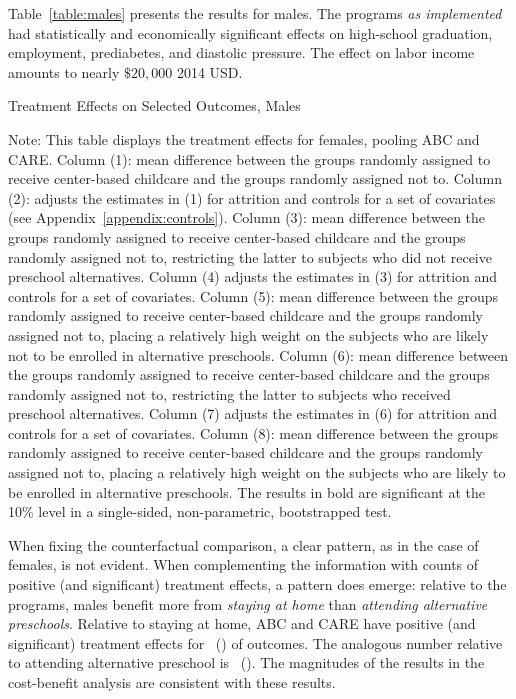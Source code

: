 \noindent Table~\ref{table:males} presents the results for males. The programs \textit{as implemented} had statistically and economically significant effects on high-school graduation, employment, prediabetes, and diastolic pressure. The effect on labor income amounts to nearly $\$20,000$ 2014 USD.\\


\begin{table}[H] 
\begin{threeparttable}
\caption{Treatment Effects on Selected Outcomes, Males}
\label{table:males}
\centering
\scalebox{.97}{ 
}
\begin{tablenotes}
\footnotesize
\item Note: This table displays the treatment effects for females, pooling ABC and CARE. Column (1): mean difference between the groups randomly assigned to receive center-based childcare and the groups randomly assigned not to. Column (2): adjusts the estimates in (1) for attrition and controls for a set of covariates (see Appendix~\ref{appendix:controls}). Column (3): mean difference between the groups randomly assigned to receive center-based childcare and the groups randomly assigned not to, restricting the latter to subjects who did not receive preschool alternatives. Column (4) adjusts the estimates in (3) for attrition and controls for a set of covariates. Column (5): mean difference between the groups randomly assigned to receive center-based childcare and the groups randomly assigned not to, placing a relatively high weight on the subjects who are likely not to be enrolled in alternative preschools. Column (6): mean difference between the groups randomly assigned to receive center-based childcare and the groups randomly assigned not to, restricting the latter to subjects who received preschool alternatives. Column (7) adjusts the estimates in (6) for attrition and controls for a set of covariates. Column (8): mean difference between the groups randomly assigned to receive center-based childcare and the groups randomly assigned not to, placing a relatively high weight on the subjects who are likely to be enrolled in alternative preschools. The results in bold are significant at the 10\% level in a single-sided, non-parametric, bootstrapped test.
\end{tablenotes}
\end{threeparttable}
\end{table}

\noindent When fixing the counterfactual comparison, a clear pattern, as in the case of females, is not evident. When complementing the information with counts of positive (and significant) treatment effects, a pattern does emerge: relative to the programs, males benefit more from \textit{staying at home} than \textit{attending alternative preschools}. Relative to staying at home, ABC and CARE have positive (and significant) treatment effects for \positivecsnm\ (\positivescsnm) of outcomes. The analogous number relative to attending alternative preschool is \positivecsam\ (\positivescsam). The magnitudes of the results in the cost-benefit analysis are  consistent with these results.

